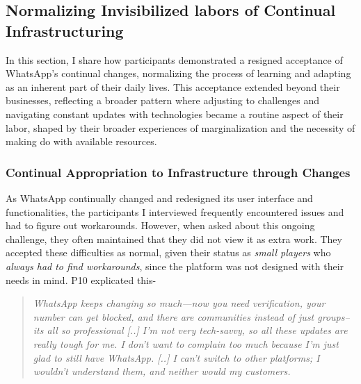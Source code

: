 \subsection{Normalizing Invisibilized labors of Continual Infrastructuring}

In this section, I share how participants demonstrated a resigned acceptance of WhatsApp's continual changes, normalizing the process of learning and adapting as an inherent part of their daily lives. This acceptance extended beyond their businesses, reflecting a broader pattern where adjusting to challenges and navigating constant updates with technologies became a routine aspect of their labor, shaped by their broader experiences of marginalization and the necessity of making do with available resources.


\subsubsection{Continual Appropriation to Infrastructure through Changes}


As WhatsApp continually changed and redesigned its user interface and functionalities, the participants I interviewed frequently encountered issues and had to figure out workarounds. However, when asked about this ongoing challenge, they often maintained that they did not view it as extra work. They accepted these difficulties as normal, given their status as \textit{small players} who \textit{always had to find workarounds}, since the platform was not designed with their needs in mind. P10 explicated this-

\begin{quote}
    \textit{WhatsApp keeps changing so much—now you need verification, your number can get blocked, and there are communities instead of just groups-- its all so professional [..] I’m not very tech-savvy, so all these updates are really tough for me. I don’t want to complain too much because I’m just glad to still have WhatsApp. [..] I can’t switch to other platforms; I wouldn’t understand them, and neither would my customers.}
\end{quote}

